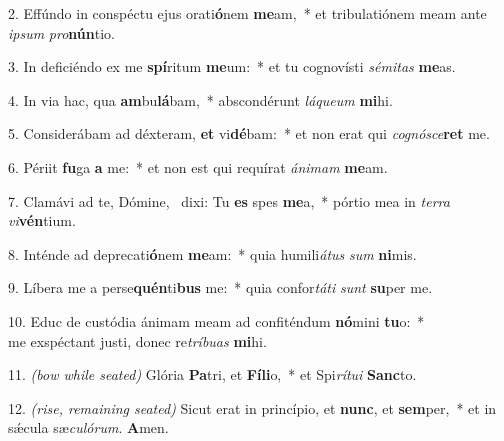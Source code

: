 2. Effúndo in conspéctu ejus orati\textbf{ó}nem \textbf{me}am,~* et tribulatiónem meam ante \textit{ip}\textit{sum} \textit{pro}\textbf{nún}tio.

3. In deficiéndo ex me \textbf{spí}ritum \textbf{me}um:~* et tu cognovísti \textit{sé}\textit{mi}\textit{tas} \textbf{me}as.

4. In via hac, qua \textbf{am}bu\textbf{lá}bam,~* abscondérunt \textit{lá}\textit{que}\textit{um} \textbf{mi}hi.

5. Considerábam ad déxteram, \textbf{et} vi\textbf{dé}bam:~* et non erat qui \textit{co}\textit{gnó}\textit{sce}\textbf{ret} me.

6. Périit \textbf{fu}ga \textbf{a} me:~* et non est qui requírat \textit{á}\textit{ni}\textit{mam} \textbf{me}am.

7. Clamávi ad te, Dómine,~{\color{red}\GreDagger} dixi: Tu \textbf{es} spes \textbf{me}a,~* pórtio mea in \textit{ter}\textit{ra} \textit{vi}\textbf{vén}tium.

8. Inténde ad deprecati\textbf{ó}nem \textbf{me}am:~* quia humili\textit{á}\textit{tus} \textit{sum} \textbf{ni}mis.

9. Líbera me a perse\textbf{quén}ti\textbf{bus} me:~* quia confor\textit{tá}\textit{ti} \textit{sunt} \textbf{su}per me.

10. Educ de custódia ánimam meam ad confiténdum \textbf{nó}mini \textbf{tu}o:~*\\ me exspéctant justi, donec re\textit{trí}\textit{bu}\textit{as} \textbf{mi}hi.

11. {\color{red}\textit{(bow while seated)}} Glória \textbf{Pa}tri, et \textbf{Fí}\textbf{li}o,~* et Spi\textit{rí}\textit{tu}\textit{i} \textbf{Sanc}to.

12. {\color{red}\textit{(rise, remaining seated)}} Sicut erat in princípio, et \textbf{nunc}, et \textbf{sem}per,~* et in s\'{\ae}cula sæ\textit{cu}\textit{ló}\textit{rum}. \textbf{A}men.
